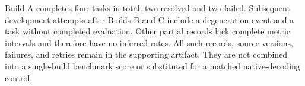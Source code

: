 Build A completes four tasks in total, two resolved and two failed. Subsequent development attempts after Builds B and C include a degeneration event and a task without completed evaluation. Other partial records lack complete metric intervals and therefore have no inferred rates. All such records, source versions, failures, and retries remain in the supporting artifact. They are not combined into a single-build benchmark score or substituted for a matched native-decoding control.
